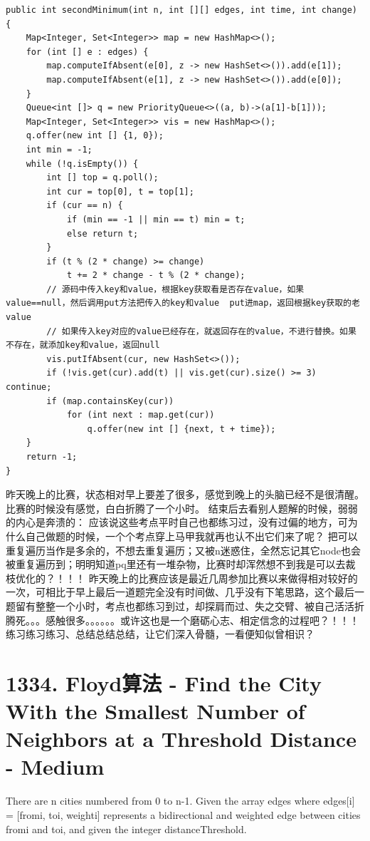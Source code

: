 \documentclass[9pt, b5paaper]{book}
\begin{document}
\begin{verbatim}
public int secondMinimum(int n, int [][] edges, int time, int change) {
    Map<Integer, Set<Integer>> map = new HashMap<>();
    for (int [] e : edges) {
        map.computeIfAbsent(e[0], z -> new HashSet<>()).add(e[1]);
        map.computeIfAbsent(e[1], z -> new HashSet<>()).add(e[0]);
    }
    Queue<int []> q = new PriorityQueue<>((a, b)->(a[1]-b[1]));
    Map<Integer, Set<Integer>> vis = new HashMap<>();
    q.offer(new int [] {1, 0});
    int min = -1;
    while (!q.isEmpty()) {
        int [] top = q.poll();
        int cur = top[0], t = top[1];
        if (cur == n) {
            if (min == -1 || min == t) min = t;
            else return t;
        }
        if (t % (2 * change) >= change)
            t += 2 * change - t % (2 * change);
        // 源码中传入key和value，根据key获取看是否存在value，如果value==null，然后调用put方法把传入的key和value  put进map，返回根据key获取的老value
        // 如果传入key对应的value已经存在，就返回存在的value，不进行替换。如果不存在，就添加key和value，返回null
        vis.putIfAbsent(cur, new HashSet<>());
        if (!vis.get(cur).add(t) || vis.get(cur).size() >= 3) continue;
        if (map.containsKey(cur))
            for (int next : map.get(cur)) 
                q.offer(new int [] {next, t + time});
    }
    return -1;
}
\end{verbatim}
昨天晚上的比赛，状态相对早上要差了很多，感觉到晚上的头脑已经不是很清醒。比赛的时候没有感觉，白白折腾了一个小时。
结束后去看别人题解的时候，弱弱的内心是奔溃的：
应该说这些考点平时自己也都练习过，没有过偏的地方，可为什么自己做题的时候，一个个考点穿上马甲我就再也认不出它们来了呢？
把可以重复遍历当作是多余的，不想去重复遍历；又被n迷惑住，全然忘记其它node也会被重复遍历到；明明知道pq里还有一堆杂物，比赛时却浑然想不到我是可以去裁枝优化的？！！！
昨天晚上的比赛应该是最近几周参加比赛以来做得相对较好的一次，可相比于早上最后一道题完全没有时间做、几乎没有下笔思路，这个最后一题留有整整一个小时，考点也都练习到过，却探肩而过、失之交臂、被自己活活折腾死。。。感触很多。。。。。。或许这也是一个磨砺心志、相定信念的过程吧？！！！练习练习练习、总结总结总结，让它们深入骨髓，一看便知似曾相识？

\section{1334. Floyd算法 - Find the City With the Smallest Number of Neighbors at a Threshold Distance - Medium}
\label{sec-7-2}
There are n cities numbered from 0 to n-1. Given the array edges where edges[i] = [fromi, toi, weighti] represents a bidirectional and weighted edge between cities fromi and toi, and given the integer distanceThreshold.
\end{document}
